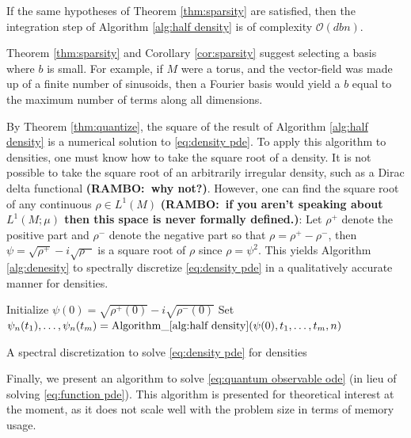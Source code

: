 \documentclass[final,leqno]{siamltex1213}
\newcommand{\ram}[1]{{\normalsize{\textbf{({\color{red}RAMBO:\ }#1)}}}}
\begin{document}
\begin{corollary} \label{cor:sparsity}
	If the same hypotheses of Theorem \ref{thm:sparsity} are satisfied, then the integration step of Algorithm \ref{alg:half density} is of complexity $\mathcal{O}( dbn)$.
\end{corollary}

Theorem \ref{thm:sparsity} and Corollary \ref{cor:sparsity} suggest selecting a basis where $b$ is small.
For example, if $M$ were a torus, and the vector-field was made up of a finite number of sinusoids, then a Fourier basis would yield a $b$ equal to the maximum number of terms along all dimensions.

By Theorem \ref{thm:quantize}, the square of the result of Algorithm \ref{alg:half density} is a numerical solution to \eqref{eq:density pde}.
To apply this algorithm to densities, one must know how to take the square root of a density.
It is not possible to take the square root of an arbitrarily irregular density, such as a Dirac delta functional \ram{why not?}.
However, one can find the square root of any continuous $\rho \in L^{1}(M)$ \ram{if you aren't speaking about $L^1(M;\mu)$ then this space is never formally defined.}:
Let $\rho^{+}$ denote the positive part and $\rho^{-}$ denote the negative part so that $\rho = \rho^{+} - \rho^{-}$, 
then $\psi = \sqrt{\rho^{+}} - i \sqrt{\rho^{-}}$ is a square root of $\rho$ since $\rho = \psi^{2}$.
This yields Algorithm \ref{alg:denesity} to spectrally discretize \eqref{eq:density pde} in a qualitatively accurate manner for densities.

\begin{algorithm}[H] 
	Initialize $\psi(0) =  \sqrt{\rho^{+}(0)} - i \sqrt{\rho^{-}(0)}$\;
	Set $\psi_{n}(t_{1}),\dots,\psi_{n}(t_{m}) =  \operatorname{ Algorithm\_ \ref{alg:half density} }( \psi(0) , t_{1} , \dots,t_{m}, n )$\;
	\caption{A spectral discretization to solve \eqref{eq:density pde} for densities} \label{alg:density}
\end{algorithm}


Finally, we present an algorithm to solve \eqref{eq:quantum observable ode} (in lieu of solving \eqref{eq:function pde}).
This algorithm is presented for theoretical interest at the moment, as it does not scale well with the problem size in terms of memory usage.
\end{document}

